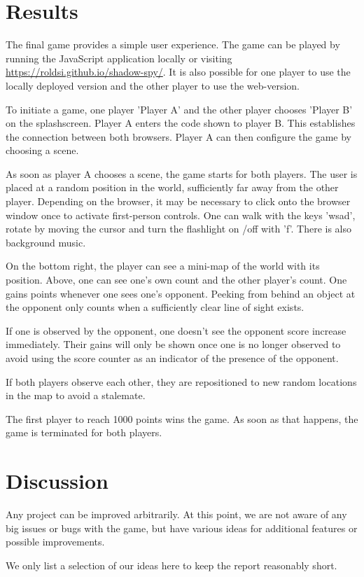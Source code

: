 \documentclass[11pt]{article}
\begin{document}
\section{Results}
\par The final game provides a simple user experience. The game can be played by running the JavaScript application locally or visiting \href{https://google.com}{https://roldsi.github.io/shadow-spy/}. It is also possible for one player to use the locally deployed version and the other player to use the web-version.
\par To initiate a game, one player 'Player A' and the other player chooses 'Player B' on the splashscreen. Player A enters the code shown to player B. This establishes the connection between both browsers. Player A can then configure the game by choosing a scene.
\par As soon as player A chooses a scene, the game starts for both players. The user is placed at a random position in the world, sufficiently far away from the other player. Depending on the browser, it may be necessary to click onto the browser window once to activate first-person controls. One can walk with the keys 'wsad', rotate by moving the cursor and turn the flashlight on /off with 'f'. There is also background music.
\par On the bottom right, the player can see a mini-map of the world with its position. Above, one can see one's own count and the other player's count. One gains points whenever one sees one's opponent. Peeking from behind an object at the opponent only counts when a sufficiently clear line of sight exists.
\par If one is observed by the opponent, one doesn't see the opponent score increase immediately. Their gains will only be shown once one is no longer observed to avoid using the score counter as an indicator of the presence of the opponent.
\par If both players observe each other, they are repositioned to new random locations in the map to avoid a stalemate.
\par The first player to reach 1000 points wins the game. As soon as that happens, the game is terminated for both players.






\section{Discussion}
\par Any project can be improved arbitrarily. At this point, we are not aware of any big issues or bugs with the game, but have various ideas for additional features or possible improvements.
\par We only list a selection of our ideas here to keep the report reasonably short.
\end{document}
